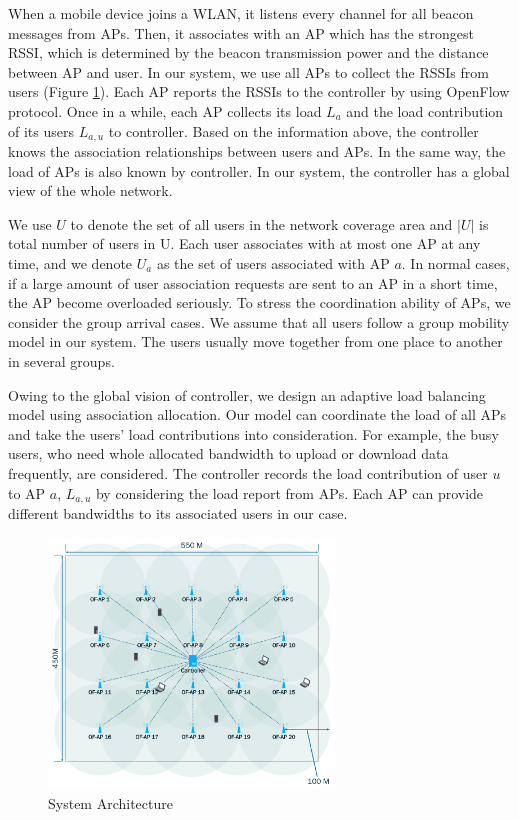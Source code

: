 When a mobile device joins a WLAN, it listens every channel for all beacon messages from APs. Then, it associates with an AP which has the strongest RSSI, which is determined by the beacon transmission power and the distance between AP and user. In our system, we use all APs to collect the RSSIs from users  (Figure \ref{fig:scheme1}). Each AP reports the RSSIs to the controller by using OpenFlow protocol. Once in a while, each AP collects its load $L_a$  and the load contribution of its users $L_{a,u}$  to controller. Based on the information above, the controller knows the association relationships between users and APs. In the same way, the load of APs is also known by controller. In our system, the controller has a global view of the whole network.

We use $U$ to denote the set of all users in the network coverage area and $|U|$ is total number of users in U. Each user associates with at most one AP at any time, and we denote $U_a$ as the set of users associated with AP $a$. In normal cases, if a large amount of user association requests are sent to an AP in a short time, the AP become overloaded seriously. To stress the coordination ability of APs, we consider the group arrival cases. We assume that all users follow a group mobility model in our system. The users usually move together from one place to another in several groups.

Owing to the global vision of controller, we design an adaptive load balancing model using association allocation. Our model can coordinate the load of all APs and take the users' load contributions into consideration. For example, the busy users, who need whole allocated bandwidth to upload or download data frequently, are considered. The controller records the load contribution of user $u$ to AP $a$, $L_{a,u}$ by considering the load report from APs. Each AP can provide different bandwidths to its associated users in our case.


\begin{figure}[tbp]
\begin{center}
\includegraphics[width=3in]{images/scheme1.pdf}
\end{center}
\caption{System Architecture}
\label{fig:scheme1}
\end{figure}

